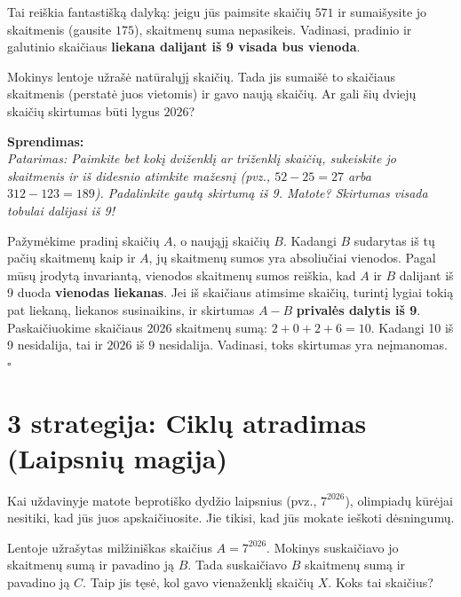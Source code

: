 \documentclass[11pt,a4paper]{scrartcl}
\newenvironment{solution}
    {\begin{list}{}{\setlength{\leftmargin}{10pt}\setlength{\rightmargin}{10pt}}\item[]}
    {\end{list}}
\begin{document}
Tai reiškia fantastišką dalyką: jeigu jūs paimsite skaičių $571$ ir sumaišysite jo skaitmenis (gausite $175$), skaitmenų suma nepasikeis. Vadinasi, pradinio ir galutinio skaičiaus \textbf{liekana dalijant iš 9 visada bus vienoda}.

\begin{example}
Mokinys lentoje užrašė natūralųjį skaičių. Tada jis sumaišė to skaičiaus skaitmenis (perstatė juos vietomis) ir gavo naują skaičių. Ar gali šių dviejų skaičių skirtumas būti lygus $2026$?
\end{example}

\begin{solution}
\textbf{Sprendimas:} \\
\textit{Patarimas: Paimkite bet kokį dviženklį ar triženklį skaičių, sukeiskite jo skaitmenis ir iš didesnio atimkite mažesnį (pvz., $52 - 25 = 27$ arba $312 - 123 = 189$). Padalinkite gautą skirtumą iš 9. Matote? Skirtumas visada tobulai dalijasi iš 9!}

Pažymėkime pradinį skaičių $A$, o naująjį skaičių $B$. Kadangi $B$ sudarytas iš tų pačių skaitmenų kaip ir $A$, jų skaitmenų sumos yra absoliučiai vienodos. 
Pagal mūsų įrodytą invariantą, vienodos skaitmenų sumos reiškia, kad $A$ ir $B$ dalijant iš 9 duoda \textbf{vienodas liekanas}.
Jei iš skaičiaus atimsime skaičių, turintį lygiai tokią pat liekaną, liekanos susinaikins, ir skirtumas $A - B$ \textbf{privalės dalytis iš 9}.
Paskaičiuokime skaičiaus $2026$ skaitmenų sumą: $2+0+2+6 = 10$. Kadangi 10 iš 9 nesidalija, tai ir $2026$ iš 9 nesidalija. Vadinasi, toks skirtumas yra neįmanomas. \hfill $\square$
\end{solution}

\section{3 strategija: Ciklų atradimas (Laipsnių magija)}

Kai uždavinyje matote beprotiško dydžio laipsnius (pvz., $7^{2026}$), olimpiadų kūrėjai nesitiki, kad jūs juos apskaičiuosite. Jie tikisi, kad jūs mokate ieškoti dėsningumų.

\begin{example}
Lentoje užrašytas milžiniškas skaičius $A = 7^{2026}$. Mokinys suskaičiavo jo skaitmenų sumą ir pavadino ją $B$. Tada suskaičiavo $B$ skaitmenų sumą ir pavadino ją $C$. Taip jis tęsė, kol gavo vienaženklį skaičių $X$. Koks tai skaičius?
\end{example}
\end{document}
